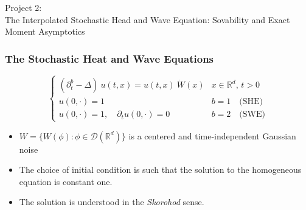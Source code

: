 \documentclass{beamer}%
\numberwithin{equation}{section}
\newcommand{\R}{\mathbb{R}}
\begin{document}
	
	
	
	\begin{frame}
		\begin{center}
			Project 2: \\
			The Interpolated Stochastic Head and Wave Equation: Sovability and Exact Moment Asymptotics
		\end{center}
	\end{frame}
	
	
	\begin{frame}[t]%
		\frametitle{The Stochastic Heat and Wave Equations}
		
		\begin{equation*}
		\begin{cases}
		\left(\partial^b_t  -\Delta \right)\: u(t,x) =  u(t,x)\: \dot W(x) & \text{$x\in \R^d$, $t>0$} \\
		u(0,\cdot) = 1                                                     & b=1 \quad \text{(SHE)}    \\
		u(0,\cdot) = 1, \quad \partial_t u(0,\cdot) = 0                    & b=2 \quad \text{(SWE)}
		\end{cases}
		\end{equation*}
		
		\vfill
		\begin{itemize}
			\item $W = \{ W(\phi) : \phi \in \mathcal{D}(\R^d) \}$ is a centered and time-independent Gaussian noise
			\bigskip
			\item The choice of initial condition is such that the solution to the homogeneous equation is constant one.
			\bigskip
			\item The solution is understood in the {\it Skorohod} sense.
		\end{itemize}
		
	\end{frame}%
\end{document}

